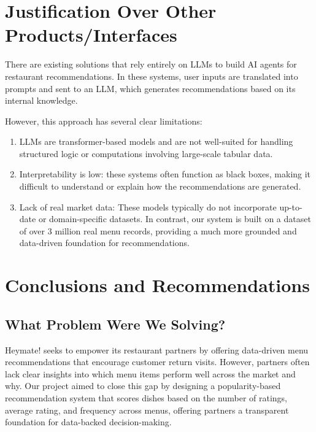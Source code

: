 \documentclass[
  11pt,
  a4paper,
  DIV=11,
  numbers=noendperiod]{scrartcl}
\providecommand{\tightlist}{%
  \setlength{\itemsep}{0pt}\setlength{\parskip}{0pt}}\usepackage{longtable,booktabs,array}
\begin{document}
\section{Justification Over Other
Products/Interfaces}\label{justification-over-other-productsinterfaces}

There are existing solutions that rely entirely on LLMs to build AI
agents for restaurant recommendations. In these systems, user inputs are
translated into prompts and sent to an LLM, which generates
recommendations based on its internal knowledge.

However, this approach has several clear limitations:

\begin{enumerate}
\def\labelenumi{\arabic{enumi}.}
\tightlist
\item
  LLMs are transformer-based models and are not well-suited for handling
  structured logic or computations involving large-scale tabular data.
\item
  Interpretability is low: these systems often function as black boxes,
  making it difficult to understand or explain how the recommendations
  are generated.
\item
  Lack of real market data: These models typically do not incorporate
  up-to-date or domain-specific datasets. In contrast, our system is
  built on a dataset of over 3 million real menu records, providing a
  much more grounded and data-driven foundation for recommendations.
\end{enumerate}

\section{Conclusions and
Recommendations}\label{conclusions-and-recommendations}

\subsection{What Problem Were We
Solving?}\label{what-problem-were-we-solving}

Heymate! seeks to empower its restaurant partners by offering
data-driven menu recommendations that encourage customer return visits.
However, partners often lack clear insights into which menu items
perform well across the market and why. Our project aimed to close this
gap by designing a popularity-based recommendation system that scores
dishes based on the number of ratings, average rating, and frequency
across menus, offering partners a transparent foundation for data-backed
decision-making.
\end{document}
